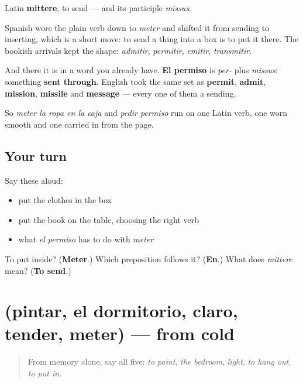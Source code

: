\begin{cousinweb}
Latin \textbf{mittere}, to send — and its participle \emph{missus}.

Spanish wore the plain verb down to \emph{meter} and shifted it from sending to inserting, which is a short move: to send a thing into a box is to put it there. The bookish arrivals kept the shape: \emph{admitir}, \emph{permitir}, \emph{emitir}, \emph{transmitir}.

And there it is in a word you already have. \textbf{El permiso} is \emph{per-} plus \emph{missus}: something \textbf{sent through}. English took the same set as \textbf{permit}, \textbf{admit}, \textbf{mission}, \textbf{missile} and \textbf{message} — every one of them a sending.

So \emph{meter la ropa en la caja} and \emph{pedir permiso} run on one Latin verb, one worn smooth and one carried in from the page.
\end{cousinweb}

\subsection*{Your turn}
Say these aloud:

\begin{itemize}
\raggedright
  \item put the clothes in the box
  \item put the book on the table, choosing the right verb
  \item what \emph{el permiso} has to do with \emph{meter}
\end{itemize}

\begin{tcolorbox}[breakable,colback=teal!4,colframe=teal!35!black,title={Before you move on}]
To put inside? (\textbf{Meter}.) Which preposition follows it? (\textbf{En}.) What does \emph{mittere} mean? (\textbf{To send}.)
\end{tcolorbox}
\section[(pintar, el dormitorio, claro, tender …]{(pintar, el dormitorio, claro, tender, meter) — from cold}

\label{lesson:ES-R455-repaso-cuarto}



\begin{quote}
From memory alone, say all five: \emph{to paint}, \emph{the bedroom}, \emph{light}, \emph{to hang out}, \emph{to put in}.
\end{quote}

